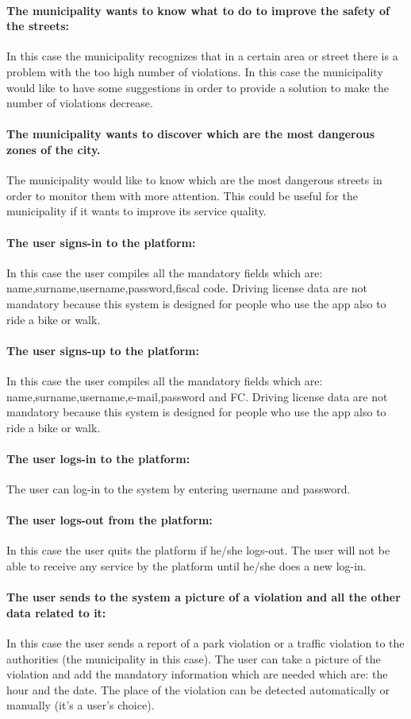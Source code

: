 \documentclass[titlepage]{article}
\begin{document}
\paragraph{The municipality wants to know what to do to 				improve the safety of the streets: }
In this case the municipality recognizes that in a certain area or street there is a problem with the too high number of violations. In this case the municipality would like to have some suggestions in order to provide a solution to make the number of violations decrease.
\paragraph{The municipality wants to discover which are the most dangerous zones of the city.}
The municipality would like to know which are the most dangerous streets in order to monitor them with more attention. This could be useful for the municipality if it wants to improve its service quality.
\paragraph{The user signs-in to the platform: }
In this case the user compiles all the mandatory fields which are: name,surname,username,password,fiscal code. Driving license data are not mandatory because this system is designed for people who use the app also to ride a bike or walk.
\paragraph{The user signs-up to the platform: }
In this case the user compiles all the mandatory fields which are: name,surname,username,e-mail,password and FC. Driving license data are not mandatory because this system is designed for people who use the app also to ride a bike or walk.
\paragraph{The user logs-in to the platform: }
The user can log-in to the system by entering username and password.
\paragraph{The user logs-out from the platform:}
In this case the user quits the platform if he/she logs-out. The user will not be able to receive any service  by the platform until he/she does a new log-in.
\paragraph{The user sends to the system a picture of a            	violation and all the other data related to it: }
In this case the user sends a report of a park violation or a traffic violation to the authorities (the municipality in this case). The user can take a picture of the violation and add the mandatory information which are needed which are: the hour and the date. The place of the violation can be detected automatically or manually (it's a user's choice).
\end{document}
